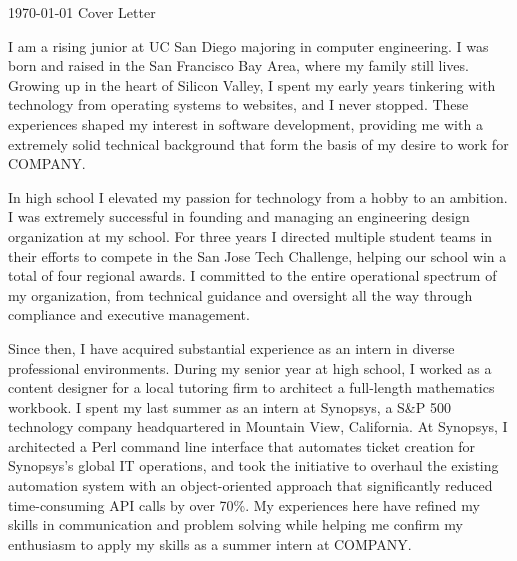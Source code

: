 \documentclass[11pt, a4paper]{awesome-cv}
\begin{document}
\makecvheader[R]

\makecvfooter
  {\today}
  {Cover Letter}
  {}

\makelettertitle

\begin{cvletter}

I am a rising junior at UC San Diego majoring in computer engineering. I was born and raised in the San Francisco Bay Area, where my family still lives. Growing up in the heart of Silicon Valley, I spent my early years tinkering with technology from operating systems to websites, and I never stopped. These experiences shaped my interest in software development, providing me with a extremely solid technical background that form the basis of my desire to work for COMPANY.

In high school I elevated my passion for technology from a hobby to an ambition. I was extremely successful in founding and managing an engineering design organization at my school. For three years I directed multiple student teams in their efforts to compete in the San Jose Tech Challenge, helping our school win a total of four regional awards. I committed to the entire operational spectrum of my organization, from technical guidance and oversight all the way through compliance and executive management.

Since then, I have acquired substantial experience as an intern in diverse professional environments. During my senior year at high school, I worked as a content designer for a local tutoring firm to architect a full-length mathematics workbook. I spent my last summer as an intern at Synopsys, a S\&P 500 technology company headquartered in Mountain View, California. At Synopsys, I architected a Perl command line interface that automates ticket creation for Synopsys's global IT operations, and took the initiative to overhaul the existing automation system with an object-oriented approach that significantly reduced time-consuming API calls by over 70\%. My experiences here have refined my skills in communication and problem solving while helping me confirm my enthusiasm to apply my skills as a summer intern at COMPANY.


\end{cvletter}
\end{document}
